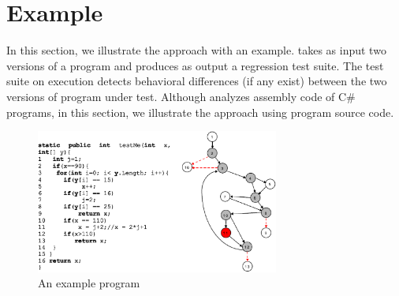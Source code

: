 \section{Example}
\label{sec:example}
In this section, we illustrate the  approach with an example.  takes as input two versions of a program and produces as output a regression test suite. The test suite on execution detects behavioral differences (if any exist) between the two versions of program under test. Although  analyzes assembly code of C\# programs, in this section, we illustrate the  approach using program source code. 


\begin{figure}[t]


\includegraphics[width=8cm, keepaspectratio]{Figures/examp}
\vspace{-0.25 in}
\caption{An example program}
\vspace{-0.2 in}
\label{fig:example}
\end{figure}

